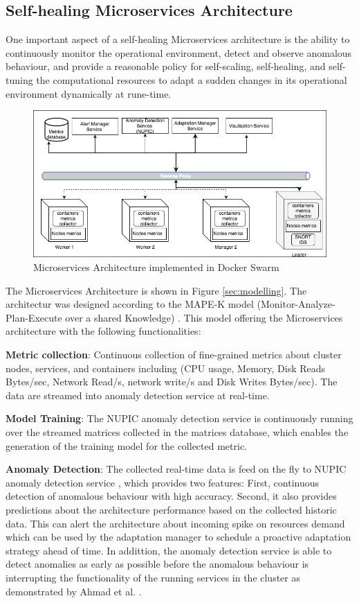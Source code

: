 \documentclass[graybox]{svmult}
\begin{document}
\subsection{Self-healing Microservices Architecture}
One important aspect of a self-healing Microservices architecture is the ability to continuously monitor the operational environment, detect and observe anomalous behaviour, and provide a reasonable policy for self-scaling, self-healing, and self-tuning the computational resources to adapt a sudden changes in its operational environment dynamically at rune-time.  
\begin{figure}[!ht] 
\centering
\includegraphics[scale=0.31]{design.png}
\caption{Microservices Architecture implemented in Docker Swarm}
\label{fig_model}
\end{figure}


 
The Microservices Architecture is shown in Figure \ref{sec:modelling}. The architectur was designed according to the MAPE-K model	(Monitor-Analyze-Plan-Execute over a shared Knowledge) \cite{computing2006architectural}. This model offering the Microservices architecture with the following functionalities: 

\textbf{Metric collection}: Continuous collection of fine-grained metrics about cluster nodes, services, and containers including (CPU usage, Memory, Disk Reads Bytes/sec, Network Read/s, network write/s and Disk Writes Bytes/sec). The data are streamed into anomaly detection service at real-time. 

\textbf{Model Training}: The NUPIC anomaly detection service \cite{AHMAD2017134} is continuously running over the streamed matrices collected in the matrices database, which enables the generation of the training model for the collected metric.  

\textbf{Anomaly Detection}: The collected real-time data is feed on the fly to NUPIC anomaly detection service \cite{AHMAD2017134}, which provides two features: First, continuous detection of anomalous behaviour with high accuracy. Second, it also provides predictions about the architecture performance based on the collected historic data. This can alert the architecture about incoming spike on resources demand which can be used by the adaptation manager to schedule a proactive adaptation strategy ahead of time. In addittion, the anomaly detection service is able to detect anomalies as early as possible before the anomalous behaviour is interrupting the functionality of the running services in the cluster as demonstrated by Ahmad et al. \cite{AHMAD2017134}. 
\end{document}
